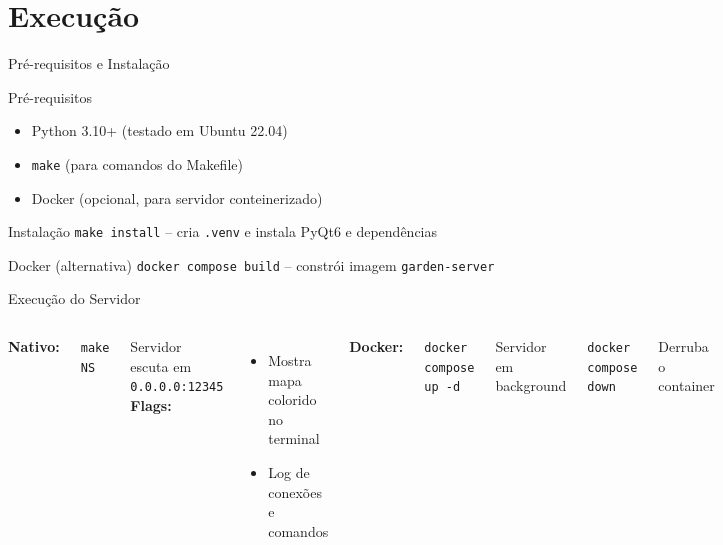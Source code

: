 \documentclass[aspectratio=169]{beamer}
\begin{document}
\section{Execu\c{c}\~ao}

\begin{frame}{Pr\'e-requisitos e Instala\c{c}\~ao}
  \begin{block}{Pr\'e-requisitos}
    \begin{itemize}
      \item Python 3.10+ (testado em Ubuntu 22.04)
      \item \texttt{make} (para comandos do Makefile)
      \item Docker (opcional, para servidor conteinerizado)
    \end{itemize}
  \end{block}
  \vfill
  \begin{block}{Instala\c{c}\~ao}
    \texttt{make install} -- cria \texttt{.venv} e instala PyQt6 e depend\^encias
  \end{block}
  \vfill
  \begin{block}{Docker (alternativa)}
    \texttt{docker compose build} -- constr\'oi imagem \texttt{garden-server}
  \end{block}
\end{frame}

\begin{frame}{Execu\c{c}\~ao do Servidor}
  \begin{columns}
    \textbf{Nativo:}
    \begin{block}{}
      \texttt{make NS}
    \end{block}
    Servidor escuta em \texttt{0.0.0.0:12345}
    \vfill
    \textbf{Flags:}
    \begin{itemize}
      \item Mostra mapa colorido no terminal
      \item Log de conex\~oes e comandos
    \end{itemize}
    \textbf{Docker:}
    \begin{block}{}
      \texttt{docker compose up -d}
    \end{block}
    Servidor em background
    \vfill
    \begin{block}{}
      \texttt{docker compose down}
    \end{block}
    Derruba o container
  \end{columns}
\end{frame}
\end{document}
